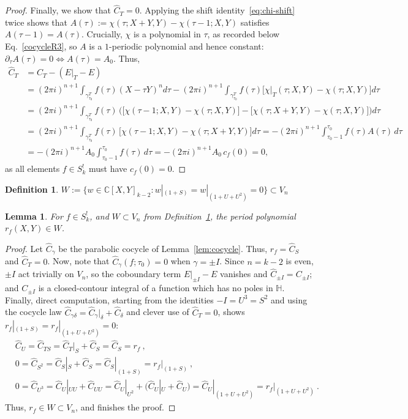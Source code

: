 \documentclass[11pt]{article}
\newtheorem{lemma}[theorem]{Lemma}
\newtheorem{definition}[theorem]{Definition}
\newcommand{\HH}{\mathbb{H}}
\newcommand{\CC}{\mathbb{C}}
\begin{document}
\begin{proof}
Finally, we show that $\hat C_T=0$. Applying the shift identity~\eqref{eq:chi-shift} twice shows
that $A(\tau):=\chi(\tau;X+Y,Y)-\chi(\tau-1;X,Y)$ satisfies $A(\tau-1)=A(\tau)$. Crucially,
$\chi$ is a polynomial in $\tau$, as recorded below Eq.~\eqref{cocycleR3}, so $A$ is a
$1$-periodic polynomial and hence constant:
$\partial_\tau A(\tau) = 0 \Leftrightarrow A(\tau) = A_0$. Thus,
\begin{align}
\hat C_T
&=C_T-(E|_T-E)
\nonumber\\ &
=(2\pi i)^{n+1}\int_{\gamma^T_{\tau_0}} f(\tau) (X - \tau Y)^n d\tau
- (2\pi i)^{n+1}\int_{\gamma^T_{\tau_0}} f(\tau)\big[\chi|_T(\tau; X, Y)-\chi(\tau; X, Y)\big] d\tau \nonumber\\
&=(2\pi i)^{n+1}\int_{\gamma^T_{\tau_0}} f(\tau)\,\bigg(\big[\chi(\tau-1; X, Y)-\chi(\tau; X, Y)\big] - \big[\chi(\tau; X+Y, Y)-\chi(\tau; X, Y)\big] \bigg) d\tau \nonumber\\
&=(2\pi i)^{n+1}\int_{\gamma^T_{\tau_0}} f(\tau)\,\big[\chi(\tau-1; X, Y)-\chi(\tau; X+Y, Y)\big] d\tau 
=-(2\pi i)^{n+1} \int_{\tau_0-1}^{\tau_0} f(\tau)A(\tau)\,d\tau \nonumber\\
&=-(2\pi i)^{n+1}A_0 \int_{\tau_0-1}^{\tau_0} f(\tau)\,d\tau
=-(2\pi i)^{n+1}A_0\,c_f(0)=0,
\end{align}
as all elements $f \in S_k^!$ must have $c_f(0) = 0$.
\end{proof}

\begin{definition}\label{def:w}
$W:=\{w\in\CC[X,Y]_{k-2}: w|_{(1+S)}=w|_{(1+U+U^2)}=0\} \subset V_n$
\end{definition}

\begin{lemma}\label{lem:rfW}
For $f\in S_k^!$, and $W \subset V_n$ from Definition~\ref{def:w}, the period polynomial $r_f(X, Y) \in W$.
\end{lemma}
\begin{proof}
Let $\hat C_\gamma$ be the parabolic cocycle of Lemma~\ref{lem:cocycle}. Thus, $r_f=\hat C_S$ 
and $\hat C_T=0$. Now, note that $\hat C_\gamma(f; \tau_0) = 0$ when $\gamma = \pm I$. Since
$n=k-2$ is even, $\pm I$ act trivially on $V_n$, so the coboundary term $E|_{\pm I}-E$ vanishes and
$\hat C_{\pm I}=C_{\pm I}$; and $C_{\pm I}$ is a closed-contour integral of a function which has no
poles in $\HH$. Finally, direct computation, starting from the identities $-I = U^3 = S^2$
and using the cocycle law $\hat C_{\gamma\delta}=\hat C_\gamma|_\delta+\hat C_\delta$ and clever 
use of $\hat C_T = 0$, shows $r_f|_{(1+S)}=r_f|_{(1+U+U^2)}=0$:
\begin{align}
&\hat C_U = \hat C_{TS} = \hat C_T|_S + \hat C_S = \hat C_S = r_f~,  \\
&0 = \hat C_{S^2} = \hat C_S|_S + \hat C_S = \hat C_S|_{(1+S)} = r_f|_{(1+S)}~,\\
&0 = \hat C_{U^3} = \hat C_U|_{UU}+\hat C_{UU}=\hat C_U|_{U^2}+\big(\hat C_U|_U+\hat C_U\big)=\hat C_U|_{(1+U+U^2)}=r_f|_{(1+U+U^2)}~.
\end{align}
Thus, $r_f \in W \subset V_n$, and finishes the proof. 
\end{proof}
\end{document}
